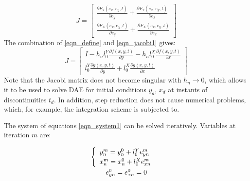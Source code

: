 \documentclass[lettersize,journal]{IEEEtran}
\begin{document}
\begin{equation}
	\label{eqn_jacobi1}
	J = \begin{bmatrix}
		\frac{\partial F_Y(e_x, e_y, t)}{\partial e_y}  +  \frac{\partial F_Y(e_x, e_y, t)}{\partial e_x} \\
		\frac{\partial F_X(e_x, e_y, t)}{\partial e_y}  +  \frac{\partial F_X(e_x, e_y, t)}{\partial e_x}
	\end{bmatrix}
\end{equation}
The combination of \eqref{eqn_define} and \eqref{eqn_jacobi1} gives:
\begin{equation}
	\label{eqn_jacobi2}
	J = \begin{bmatrix}
		I - h_nl_0^Y\frac{\partial f(x, y, t)}{\partial y}  -  h_nl_0^X\frac{\partial f(x, y, t)}{\partial x} \\
		l_0^Y\frac{\partial g(x, y, t)}{\partial y} +  l_0^X\frac{\partial g(x, y, t)}{\partial x} 
	\end{bmatrix}
\end{equation}
Note that the Jacobi matrix does not become singular with \(h_n\rightarrow 0\), which allows it to be used to solve DAE for initial conditions \(y_d\), \(x_d\) at instants of discontinuities \(t_d\). In addition, step reduction does not cause numerical problems, which, for example, the integration scheme \cite{petzold82} is subjected to.

The system of equations \eqref{eqn_system1} can be solved iteratively. Variables at iteration \(m\) are:

\begin{equation}
	\label{eqn_mitervars}
	\begin{array}{c}
		\def\arraystretch{1.3}
		\begin{array}{c}
			\begin{cases}
				\begin{array}{l}
					y_n^m =y_n^0+l_0^Ye_{yn}^m \\
					x_n^m =x_n^0+l_0^Xe_{xn}^m \\
				\end{array} \\
			\end{cases} \\
			e_{yn}^0=e_{xn}^0= 0 
		\end{array}
	\end{array}
\end{equation}
\end{document}
